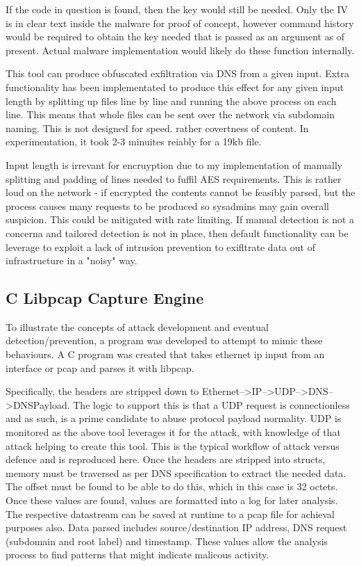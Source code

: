 If the code in question is found, then the key would still be needed. Only the IV is in clear text inside the malware for proof of concept, however command history would be required to obtain the key needed that is passed as an argument as of present. 
Actual malware implementation would likely do these function internally. 


This tool can produce obfuscated exfiltration via DNS from a given input. Extra functionality has been implementated to produce this effect for any given input length by splitting up files line by line and running the above process on each line. This means that whole files can be sent over the network via subdomain naming. This is not designed for speed. rather covertness of content. 
In experimentation, it took 2-3 minuites reiably for a 19kb file. 

Input length is irrevant for encruyption due to my implementation of manually splitting and padding of lines needed to fuffil AES requirements. This is rather loud on the network - if encrypted the contents cannot be feasibly parsed, but the process causes many requests to be produced so sysadmins may gain overall suspicion.
This could be mitigated with rate limiting. If manual detection is not a concerna and tailored detection is not in place, then default functionality can be leverage to exploit a lack of intrusion prevention to exifltrate data out of infrastructure in a "noisy" way.


\subsection{C Libpcap Capture Engine}
To illustrate the concepts of attack development and eventual detection/prevention, a program was developed to attempt to mimic these behaviours. A C program was created that takes ethernet ip input from an interface or pcap and parses it with libpcap.

Specifically, the headers are stripped down to Ethernet-->IP-->UDP-->DNS-->DNSPayload. The logic to support this is that a UDP request is connectionless and as such, is a prime candidate to abuse protocol payload normality. UDP is monitored as the above tool leverages it for the attack, with knowledge of that attack helping to create this tool. This is the typical workflow of attack versus defence and is reproduced here.
Once the headers are stripped into structs, memory must be traversed as per DNS specification to extract the needed data. The offset must be found to be able to do this, which in this case is 32 octets. Once these values are found, values are formatted into a log for later analysis. The respective datastream can be saved at runtime to a pcap file for achieval purposes also. Data parsed includes source/destination IP address, DNS request (subdomain and root label)
and timestamp. These values allow the analysis process to find patterns that might indicate malicous activity.


